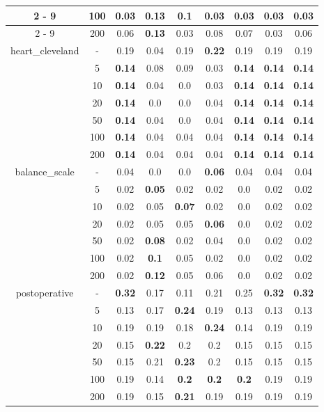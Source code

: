 \documentclass{article}%
\begin{document}
\begin{longtable}{c|c|ccccccc}
\cline{2%
-%
9}%
&100&0.03&\textbf{0.13}&0.1&0.03&0.03&0.03&0.03\\%
\cline{2%
-%
9}%
&200&0.06&\textbf{0.13}&0.03&0.08&0.07&0.03&0.06\\%
\hline%
\multirow{7}{*}{heart\_cleveland}&{-}&0.19&0.04&0.19&\textbf{0.22}&0.19&0.19&0.19\\%
\cline{2%
-%
9}%
&5&\textbf{0.14}&0.08&0.09&0.03&\textbf{0.14}&\textbf{0.14}&\textbf{0.14}\\%
\cline{2%
-%
9}%
&10&\textbf{0.14}&0.04&0.0&0.03&\textbf{0.14}&\textbf{0.14}&\textbf{0.14}\\%
\cline{2%
-%
9}%
&20&\textbf{0.14}&0.0&0.0&0.04&\textbf{0.14}&\textbf{0.14}&\textbf{0.14}\\%
\cline{2%
-%
9}%
&50&\textbf{0.14}&0.04&0.0&0.04&\textbf{0.14}&\textbf{0.14}&\textbf{0.14}\\%
\cline{2%
-%
9}%
&100&\textbf{0.14}&0.04&0.04&0.04&\textbf{0.14}&\textbf{0.14}&\textbf{0.14}\\%
\cline{2%
-%
9}%
&200&\textbf{0.14}&0.04&0.04&0.04&\textbf{0.14}&\textbf{0.14}&\textbf{0.14}\\%
\hline%
\multirow{7}{*}{balance\_scale}&{-}&0.04&0.0&0.0&\textbf{0.06}&0.04&0.04&0.04\\%
\cline{2%
-%
9}%
&5&0.02&\textbf{0.05}&0.02&0.02&0.0&0.02&0.02\\%
\cline{2%
-%
9}%
&10&0.02&0.05&\textbf{0.07}&0.02&0.0&0.02&0.02\\%
\cline{2%
-%
9}%
&20&0.02&0.05&0.05&\textbf{0.06}&0.0&0.02&0.02\\%
\cline{2%
-%
9}%
&50&0.02&\textbf{0.08}&0.02&0.04&0.0&0.02&0.02\\%
\cline{2%
-%
9}%
&100&0.02&\textbf{0.1}&0.05&0.02&0.0&0.02&0.02\\%
\cline{2%
-%
9}%
&200&0.02&\textbf{0.12}&0.05&0.06&0.0&0.02&0.02\\%
\hline%
\multirow{7}{*}{postoperative}&{-}&\textbf{0.32}&0.17&0.11&0.21&0.25&\textbf{0.32}&\textbf{0.32}\\%
\cline{2%
-%
9}%
&5&0.13&0.17&\textbf{0.24}&0.19&0.13&0.13&0.13\\%
\cline{2%
-%
9}%
&10&0.19&0.19&0.18&\textbf{0.24}&0.14&0.19&0.19\\%
\cline{2%
-%
9}%
&20&0.15&\textbf{0.22}&0.2&0.2&0.15&0.15&0.15\\%
\cline{2%
-%
9}%
&50&0.15&0.21&\textbf{0.23}&0.2&0.15&0.15&0.15\\%
\cline{2%
-%
9}%
&100&0.19&0.14&\textbf{0.2}&\textbf{0.2}&\textbf{0.2}&0.19&0.19\\%
\cline{2%
-%
9}%
&200&0.19&0.15&\textbf{0.21}&0.19&0.19&0.19&0.19\\%
\hline%
\end{longtable}
\end{document}
